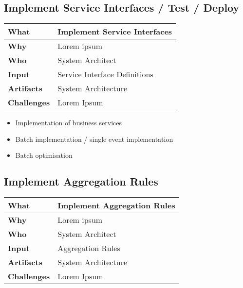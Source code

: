 \subsection{Implement Service Interfaces / Test / Deploy}
\begin{minipage}{\textwidth}
 \label{table:ch6_Task_Implement_Service_Interfaces}
\begin{tabular}
	{|m{3cm}|m{10cm}|} \hline \bfseries What & Implement Service Interfaces\\
	\hline \bfseries Why & Lorem ipsum\\
	\hline \bfseries Who & System Architect\\
	\hline \bfseries Input & Service Interface Definitions\\
	\hline \bfseries Artifacts & System Architecture\\
	\hline \bfseries Challenges & Lorem Ipsum\\
	\hline 
\end{tabular}
\end{minipage}

\begin{itemize}
	\item Implementation of business services
	\item Batch implementation / single event implementation
	\item Batch optimisation
\end{itemize}

\subsection{Implement Aggregation Rules}
\begin{minipage}{\textwidth}
 \label{table:ch6_Task_Implement_Aggregation_Rules}
\begin{tabular}
	{|m{3cm}|m{10cm}|} \hline \bfseries What & Implement Aggregation Rules\\
	\hline \bfseries Why & Lorem ipsum\\
	\hline \bfseries Who & System Architect\\
	\hline \bfseries Input & Aggregation Rules\\
	\hline \bfseries Artifacts & System Architecture\\
	\hline \bfseries Challenges & Lorem Ipsum\\
	\hline 
\end{tabular}
\end{minipage}


